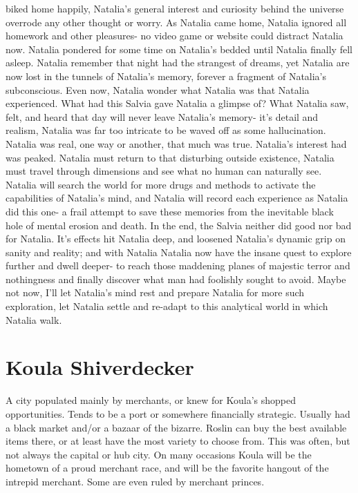 \documentclass[12pt]{book}
\begin{document}
biked home happily, Natalia's general interest and curiosity behind the universe overrode any other thought or worry. As Natalia came home, Natalia ignored all homework and other pleasures- no video game or website could distract Natalia now. Natalia pondered for some time on Natalia's bedded until Natalia finally fell asleep. Natalia remember that night had the strangest of dreams, yet Natalia are now lost in the tunnels of Natalia's memory, forever a fragment of Natalia's subconscious. Even now, Natalia wonder what Natalia was that Natalia experienced. What had this Salvia gave Natalia a glimpse of? What Natalia saw, felt, and heard that day will never leave Natalia's memory- it's detail and realism, Natalia was far too intricate to be waved off as some hallucination. Natalia was real, one way or another, that much was true. Natalia's interest had was peaked. Natalia must return to that disturbing outside existence, Natalia must travel through dimensions and see what no human can naturally see. Natalia will search the world for more drugs and methods to activate the capabilities of Natalia's mind, and Natalia will record each experience as Natalia did this one- a frail attempt to save these memories from the inevitable black hole of mental erosion and death. In the end, the Salvia neither did good nor bad for Natalia. It's effects hit Natalia deep, and loosened Natalia's dynamic grip on sanity and reality; and with Natalia Natalia now have the insane quest to explore further and dwell deeper- to reach those maddening planes of majestic terror and nothingness and finally discover what man had foolishly sought to avoid. Maybe not now, I'll let Natalia's mind rest and prepare Natalia for more such exploration, let Natalia settle and re-adapt to this analytical world in which Natalia walk.



\chapter{Koula Shiverdecker}

A city populated mainly by merchants, or knew for Koula's shopped opportunities. Tends to be a port or somewhere financially strategic. Usually had a black market and/or a bazaar of the bizarre. Roslin can buy the best available items there, or at least have the most variety to choose from. This was often, but not always the capital or hub city. On many occasions Koula will be the hometown of a proud merchant race, and will be the favorite hangout of the intrepid merchant. Some are even ruled by merchant princes.
\end{document}
